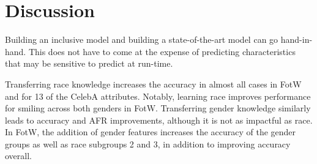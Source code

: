 \documentclass{article}
\begin{document}
\section{Discussion}\label{sec:discussion}

Building an inclusive model and building a state-of-the-art model can go hand-in-hand. This does not have to come at the expense of predicting characteristics that may be sensitive to predict at run-time.

Transferring race knowledge increases the accuracy in almost all cases in FotW and for 13 of the CelebA attributes. Notably, learning race improves performance for smiling across both genders in FotW.   Transferring gender knowledge similarly leads to accuracy and AFR improvements, although it is not as impactful as race.  In FotW, the addition of gender features increases the accuracy of the gender groups as well as race subgroups 2 and 3, in addition to improving accuracy overall. %



\end{document}
